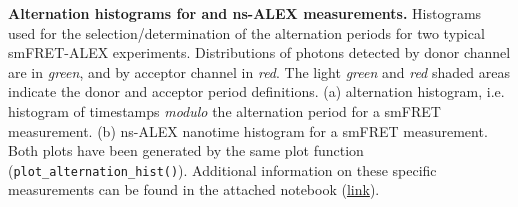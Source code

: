 \label{fig:altern_hist_double} \textbf{Alternation histograms for \usalex and ns-ALEX measurements.} 
Histograms used for the selection/determination 
of the alternation periods for two typical smFRET-ALEX experiments.
Distributions of photons detected by donor channel are in \textit{green}, and by acceptor channel in \textit{red}.
The light \textit{green} and \textit{red} shaded areas indicate the donor and acceptor period definitions.
(a) \usalex alternation histogram, i.e. histogram of timestamps \textit{modulo} the alternation period for a smFRET measurement. 
(b) ns-ALEX nanotime histogram for a smFRET measurement. 
Both plots have been generated by the same plot function (\texttt{plot\_alternation\_hist()}). 
Additional information on these specific measurements can be found in the attached notebook 
(\href{http://nbviewer.jupyter.org/github/tritemio/fretbursts_paper/blob/master/notebooks/Figures\%20-\%20ALEX\%20histograms.ipynb}{link}).